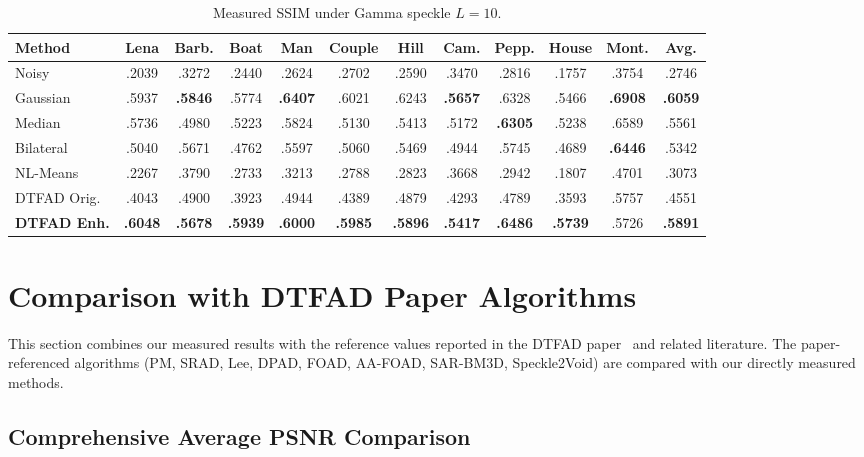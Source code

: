 \documentclass[12pt,a4paper]{article}
\newcommand{\best}[1]{\textcolor{bestgreen}{\textbf{#1}}}
\newcommand{\second}[1]{\textcolor{secondbest}{\textbf{#1}}}
\begin{document}
\begin{table}[H]
\centering
\caption{Measured SSIM under Gamma speckle $L=10$.}
\label{tab:ssim_L10_measured}
\small
\setlength{\tabcolsep}{3pt}
\begin{tabular}{l*{10}{c}|c}
\toprule
\textbf{Method} & \textbf{Lena} & \textbf{Barb.} & \textbf{Boat} & \textbf{Man} & \textbf{Couple} & \textbf{Hill} & \textbf{Cam.} & \textbf{Pepp.} & \textbf{House} & \textbf{Mont.} & \textbf{Avg.} \\
\midrule
\rowcolor{lightblue!30}
Noisy & .2039 & .3272 & .2440 & .2624 & .2702 & .2590 & .3470 & .2816 & .1757 & .3754 & .2746 \\
\midrule
Gaussian & .5937 & \second{.5846} & .5774 & \best{.6407} & .6021 & .6243 & \second{.5657} & .6328 & .5466 & \best{.6908} & \second{.6059} \\
Median & .5736 & .4980 & .5223 & .5824 & .5130 & .5413 & .5172 & \best{.6305} & .5238 & .6589 & .5561 \\
Bilateral & .5040 & .5671 & .4762 & .5597 & .5060 & .5469 & .4944 & .5745 & .4689 & \second{.6446} & .5342 \\
NL-Means & .2267 & .3790 & .2733 & .3213 & .2788 & .2823 & .3668 & .2942 & .1807 & .4701 & .3073 \\
DTFAD Orig. & .4043 & .4900 & .3923 & .4944 & .4389 & .4879 & .4293 & .4789 & .3593 & .5757 & .4551 \\
\textbf{DTFAD Enh.} & \best{.6048} & \best{.5678} & \best{.5939} & \second{.6000} & \best{.5985} & \best{.5896} & \best{.5417} & \second{.6486} & \best{.5739} & .5726 & \best{.5891} \\
\bottomrule
\end{tabular}
\end{table}

\section{Comparison with DTFAD Paper Algorithms}

This section combines our measured results with the reference values reported in the DTFAD paper~\cite{wei2025dtfad} and related literature. The paper-referenced algorithms (PM, SRAD, Lee, DPAD, FOAD, AA-FOAD, SAR-BM3D, Speckle2Void) are compared with our directly measured methods.

\subsection{Comprehensive Average PSNR Comparison}
\end{document}
